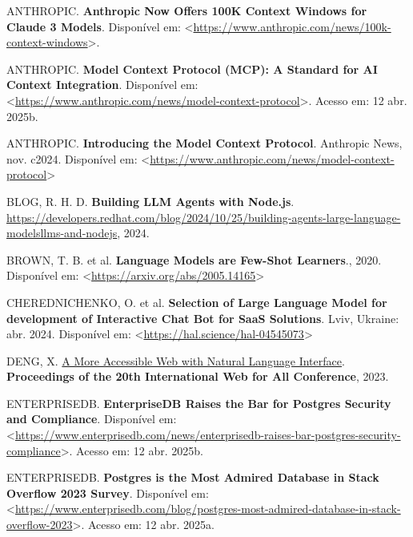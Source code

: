 \documentclass[
]{article}
\newlength{\cslhangindent}
\newenvironment{CSLReferences}[2] %
 {\begin{list}{}{%
  \setlength{\itemindent}{0pt}
  \setlength{\leftmargin}{0pt}
  \setlength{\parsep}{0pt}
  \ifodd #1
   \setlength{\leftmargin}{\cslhangindent}
   \setlength{\itemindent}{-1\cslhangindent}
  \fi
  \setlength{\itemsep}{#2\baselineskip}}}
 {\end{list}}
\begin{document}
\label{refs}
\begin{CSLReferences}{0}{1}
ANTHROPIC. \textbf{Anthropic Now Offers 100K Context Windows for Claude
3 Models}. Disponível em:
\textless{}\url{https://www.anthropic.com/news/100k-context-windows}\textgreater.

ANTHROPIC. \textbf{Model Context Protocol (MCP): A Standard for AI
Context Integration}. Disponível em:
\textless{}\url{https://www.anthropic.com/news/model-context-protocol}\textgreater.
Acesso em: 12 abr. 2025b.

ANTHROPIC. \textbf{{Introducing the Model Context Protocol}}. Anthropic
News, nov. c2024. Disponível em:
\textless{}\url{https://www.anthropic.com/news/model-context-protocol}\textgreater{}

BLOG, R. H. D. \textbf{Building LLM Agents with Node.js}.
\url{https://developers.redhat.com/blog/2024/10/25/building-agents-large-language-modelsllms-and-nodejs},
2024.

BROWN, T. B. et al. \textbf{Language Models are Few-Shot Learners}.,
2020. Disponível em:
\textless{}\url{https://arxiv.org/abs/2005.14165}\textgreater{}

CHEREDNICHENKO, O. et al. \textbf{Selection of Large Language Model for
development of Interactive Chat Bot for SaaS Solutions}. Lviv, Ukraine:
abr. 2024. Disponível em:
\textless{}\url{https://hal.science/hal-04545073}\textgreater{}

DENG, X. \href{https://api.semanticscholar.org/CorpusID:258259387}{A
More Accessible Web with Natural Language Interface}.
\textbf{Proceedings of the 20th International Web for All Conference},
2023.

ENTERPRISEDB. \textbf{EnterpriseDB Raises the Bar for Postgres Security
and Compliance}. Disponível em:
\textless{}\url{https://www.enterprisedb.com/news/enterprisedb-raises-bar-postgres-security-compliance}\textgreater.
Acesso em: 12 abr. 2025b.

ENTERPRISEDB. \textbf{Postgres is the Most Admired Database in Stack
Overflow 2023 Survey}. Disponível em:
\textless{}\url{https://www.enterprisedb.com/blog/postgres-most-admired-database-in-stack-overflow-2023}\textgreater.
Acesso em: 12 abr. 2025a.


\end{CSLReferences}
\end{document}
